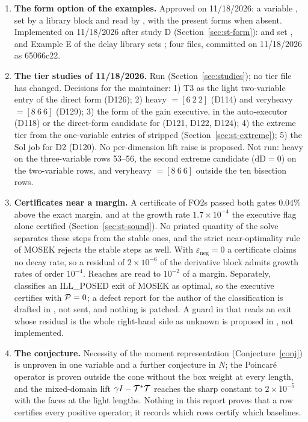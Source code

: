 \begin{enumerate}
\item \textbf{The form option of the examples.} Approved on 11/18/2026: a variable , set by a library block and read by , with the present forms when absent. Implemented on 11/18/2026 after study D (Section~\ref{sec:st-form}):  and  set , and Example E of the delay library sets ; four files, committed on 11/18/2026 as 65066c22.
\item \textbf{The tier studies of 11/18/2026.} Run (Section~\ref{sec:studies}); no tier file has changed. Decisions for the maintainer: 1) T3 as the light two-variable entry of the direct form (D126); 2) heavy  $=[6\ 2\ 2]$ (D114) and veryheavy  $=[8\ 6\ 6]$ (D129); 3) the form of the gain executive,  in the auto-executor (D118) or the direct-form candidate for  (D121, D122, D124); 4) the extreme tier from the one-variable entries of stripped (Section~\ref{sec:st-extreme}); 5) the Sol job for D2 (D120). No per-dimension lift raise is proposed. Not run: heavy on the three-variable rows 53--56, the second extreme candidate ($\mathrm{dD}=0$) on the two-variable rows, and veryheavy  $=[8\ 6\ 6]$ outside the ten bisection rows.
\item \textbf{Certificates near a margin.}\label{it:open-margin} A certificate of FO2s passed both gates $0.04\%$ above the exact margin, and at the growth rate $1.7\times10^{-4}$ the executive flag alone certified (Section~\ref{sec:st-sound}). No printed quantity of the solve separates these steps from the stable ones, and the strict near-optimality rule of MOSEK rejects the stable steps as well. With $\varepsilon_{\mathrm{neg}}=0$ a certificate claims no decay rate, so a residual of $2\times10^{-6}$ of the derivative block admits growth rates of order $10^{-4}$. Reaches are read to $10^{-2}$ of a margin. Separately,  classifies an ILL\_POSED exit of MOSEK as optimal, so the executive certifies with $\mathcal{P}=0$; a defect report for the author of the classification is drafted in , not sent, and nothing is patched. A guard in  that reads an exit whose residual is the whole right-hand side as unknown is proposed in , not implemented.
\item \textbf{The conjecture.} Necessity of the moment representation (Conjecture~\ref{conj}) is unproven in one variable and a further conjecture in $N$; the Poincar\'e operator is proven outside the cone without the box weight at every length, and the mixed-domain lift $\gamma I-\mathcal{T}^*\mathcal{T}$ reaches the sharp constant to $2\times10^{-5}$ with the faces at the light lengths. Nothing in this report proves that a row certifies every positive operator; it records which rows certify which baselines.
\end{enumerate}
\endgroup
